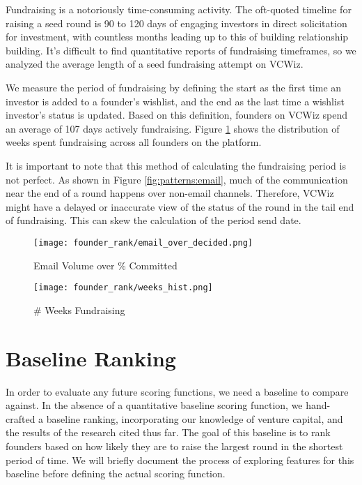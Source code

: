 Fundraising is a notoriously time-consuming activity. The oft-quoted timeline for raising a seed round is 90 to 120 days of engaging investors in direct solicitation for investment, with countless months leading up to this of building relationship building. It's difficult to find quantitative reports of fundraising timeframes, so we analyzed the average length of a seed fundraising attempt on VCWiz.

We measure the period of fundraising by defining the start as the first time an investor is added to a founder's wishlist, and the end as the last time a wishlist investor's status is updated. Based on this definition, founders on VCWiz spend an average of 107 days actively fundraising. Figure \ref{fig:patterns:fundraising} shows the distribution of weeks spent fundraising across all founders on the platform.

It is important to note that this method of calculating the fundraising period is not perfect. As shown in Figure \ref{fig:patterns:email}, much of the communication near the end of a round happens over non-email channels. Therefore, VCWiz might have a delayed or inaccurate view of the status of the round in the tail end of fundraising. This can skew the calculation of the period send date.

\begin{figure}[ht]
  \centering
  \begin{minipage}[t]{0.5\textwidth}
    \centering
    \texttt{[image: founder\_rank/email\_over\_decided.png]}
    \caption{Email Volume over \% Committed}
    \label{fig:patterns:email}
  \end{minipage}\hfill
  \begin{minipage}[t]{0.5\textwidth}
    \centering
    \texttt{[image: founder\_rank/weeks\_hist.png]}
    \caption{\# Weeks Fundraising}
    \label{fig:patterns:fundraising}
  \end{minipage}
\end{figure}

\section{Baseline Ranking}

In order to evaluate any future scoring functions, we need a baseline to compare against. In the absence of a quantitative baseline scoring function, we hand-crafted a baseline ranking, incorporating our knowledge of venture capital, and the results of the research cited thus far. The goal of this baseline is to rank founders based on how likely they are to raise the largest round in the shortest period of time. We will briefly document the process of exploring features for this baseline before defining the actual scoring function.

